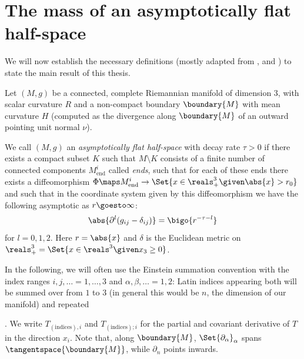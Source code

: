 \documentclass[titlepage,numbers=noenddot,headinclude,oneside,%
footinclude=true,cleardoublepage=empty,%
BCOR=5mm,paper=a4,fontsize=11pt,%
english,%
]{scrartcl}
\begin{document}
\section{The mass of an asymptotically flat half-space}
We will now establish the necessary definitions (mostly adapted from \cite{almarazPositiveMassTheorem2016}, \cite{eichmairDoublingAsymptoticallyFlat2023} and \cite{brayHarmonicFunctionsMass2019}) to state the main result of this thesis.
\begin{definition}\label{def:asymptotically_flat_half_space}
    Let \( (M,g) \) be a connected, complete Riemannian manifold of dimension 3, with scalar curvature \( R \) and a non-compact boundary \( \boundary{M} \) with mean curvature \( H \) (computed as the divergence along \( \boundary{M} \) of an outward pointing unit normal \( \nu \)).

    We call \((M,g) \) an \emph{asymptotically flat half-space} with decay rate \( \tau>0 \) if there exists a compact subset \( K \) such that \( M\setminus K \) consists of a finite number of connected components \(M_{\mathrm{end}}^i \) called \emph{ends}, such that for each of these ends there exists a diffeomorphism \( \Phi\maps M_{\mathrm{end}}^i \to \Set{x\in \reals^3_+\given \abs{x}>r_0} \) and such that in the coordinate system given by this diffeomorphism we have the following asymptotic as \( r\goesto \infty \):
    \begin{equation}
        \abs{\partial^l(g_{ij}-\delta_{ij})}=\bigo{r^{-\tau-l}}
    \end{equation}
    for \( l=0,1,2 \). Here \( r=\abs{x} \) and \( \delta \) is the Euclidean metric on \( \reals^3_+=\Set{x\in \reals^3\given x_3\geq 0} \). 
\end{definition}
\begin{notation}
    In the following, we will often use the Einstein summation convention with the index ranges \( i,j,\dotsc=1,\dotsc,3\) and \( \alpha,\beta,\dotsc=1,2 \): Latin indices appearing both  will be summed over from \( 1  \) to \( 3 \) (in general this would be \( n \), the dimension of our manifold) and repeated 
\end{notation}. We write \( T_{(\text{indices}),i} \) and \( T_{(\text{indices});i} \) for the partial and covariant derivative of \( T \) in the direction \( x_i \). Note that, along \( \boundary{M} \), \( \Set{\partial_\alpha}_\alpha \) spans \( \tangentspace{\boundary{M}} \), while \( \partial_n \) points inwards.
\end{document}
